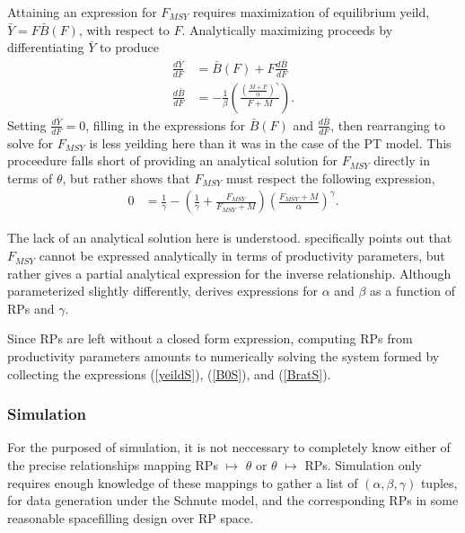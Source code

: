 \documentclass[12pt]{article}
\begin{document}
%
Attaining an expression for $F_{MSY}$ requires maximization of equilibrium 
yeild, $\bar{Y}=F\bar{B}(F)$, with respect to $F$. Analytically maximizing 
proceeds by differentiating $\bar{Y}$ to produce
%
\begin{align}
\frac{d \bar{Y}}{dF} &= \bar B(F) + F \frac{d \bar B}{dF} \label{FderivS}\\
\frac{d \bar B}{dF} &= -\frac{1}{\beta}  \left(\frac{\left(\frac{M+F}{\alpha}\right)^\gamma}{F+M}\right)\label{dBdFS}.
\end{align}
%
Setting $\frac{d \bar{Y}}{dF}=0$, filling in the expressions for $\bar B(F)$ 
and $\frac{d \bar B}{dF}$, then rearranging to solve for $F_{MSY}$ is less 
yeilding here than it was in the case of the PT model. This proceedure falls 
short of providing an analytical solution for $F_{MSY}$ directly in terms of 
$\theta$, %
but rather shows that $F_{MSY}$ must respect the following expression,  
%
\begin{align}\label{FmsyS}
0 &= \frac{1}{\gamma} - \left(\frac{1}{\gamma} + \frac{F_{MSY}}{F_{MSY}+M}\right)\left(\frac{F_{MSY}+M}{\alpha}\right)^\gamma.  
\end{align}

The lack of an analytical solution here is understood. 
 specifically points out that 
$F_{MSY}$ cannot be expressed analytically in terms of productivity parameters, 
but rather gives a partial analytical expression for the inverse relationship. 
Although parameterized slightly differently,  
derives expressions for $\alpha$ and $\beta$ as a function of RPs and $\gamma$. 

%
Since RPs are left without a closed form expression, computing RPs from 
productivity parameters amounts to numerically solving the system formed by collecting the 
expressions (\ref{yeildS}), (\ref{B0S}), and (\ref{BratS}).

%
\subsubsection{Simulation}

%
For the purposed of simulation, it is not neccessary to completely know either 
of the precise relationships mapping RPs $\mapsto$ $\theta$ or $\theta$ $\mapsto$ 
RPs. Simulation only requires enough knowledge of these mappings to gather a list 
of $(\alpha, \beta, \gamma)$ tuples, for data generation under the Schnute model, 
and the corresponding RPs in some reasonable spacefilling design over RP space. 
\end{document}
